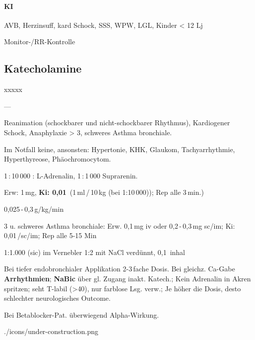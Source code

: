 \paragraph{KI} AVB, Herzinsuff, kard Schock, SSS, WPW, LGL, Kinder {\textless} 12
Lj


Monitor-/RR-Kontrolle


\bigskip
%

\subsection{Katecholamine}

%

{
\begin{labeling}[~]{xxxxx}
  \item[Beschreibung:] --- 
  \item[I:] Reanimation (schockbarer und nicht-schockbarer Rhythmus),
  Kardiogener Schock, Anaphylaxie > 3{\textdegree},  schweres Asthma bronchiale.
  \item[KI:]Im Notfall keine, ansonsten: 
  Hypertonie, KHK, Glaukom, Tachyarrhythmie, Hyperthyreose,
  Phäochromocytom.
  \item[Präparate:] 1\,:\,10\,000 : L-Adrenalin, 1\,:\,1\,000 Suprarenin.
  \item[Rx:]
  \begin{inparaitem}
    \item {} Erw: 1\,mg, \textbf{Ki: 0,01\,}
    (1\,ml\,/\,10\,kg (bei 1:10\,000)); Rep alle 3\,min.)
    \item {} 0,025\,-\,0,3\,{\textmu}g/kg/min
    \item {} 3{\textdegree} u. schweres Asthma bronchiale: Erw.
    0,1\,mg iv oder 0,2\,-\,0,3\,mg sc/im; Ki: 0,01\,/sc/im;
    Rep alle 5-15 Min
    \item {} 1:1.000 (sic) im Vernebler 1:2 mit NaCl
    verdünnt, 0,1\, inhal
  \end{inparaitem}
  \item[Anm.:] Bei tiefer endobronchialer Applikation 2-3\,fache Dosis. Bei
  gleichz. Ca-Gabe \textbf{Arrhythmien}; \textbf{NaBic} über gl. Zugang inakt. Katech.; Kein Adrenalin in Akren spritzen; seht
  T{\textdegree}-labil ({\textgreater}40{\textcelsius}), nur farblose
  Lsg. verw.; Je höher die Dosis, desto schlechter neurologisches Outcome.
  \item[Cave:] Bei Betablocker-Pat. überwiegend Alpha-Wirkung.
\end{labeling}
}
{}
{./icons/under-construction.png}
{}
{}







